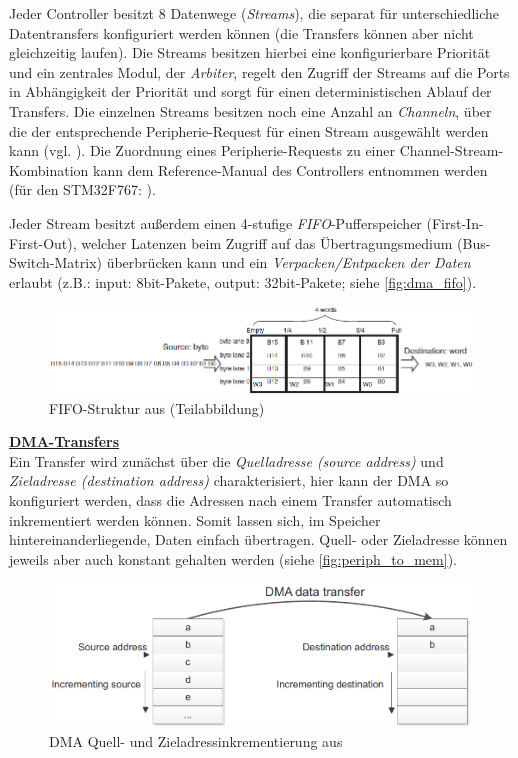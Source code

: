 \documentclass[a4paper, portrait, 12pt]{scrartcl} %
\begin{document}
Jeder Controller besitzt 8 Datenwege (\emph{Streams}), die separat für unterschiedliche Datentransfers konfiguriert werden können (die Transfers können aber nicht gleichzeitig laufen). Die Streams besitzen hierbei eine konfigurierbare Priorität und ein zentrales Modul, der \emph{Arbiter}, regelt den Zugriff der Streams auf die Ports in Abhängigkeit der Priorität und sorgt für einen deterministischen Ablauf der Transfers. Die einzelnen Streams besitzen noch eine Anzahl an \emph{Channeln}, über die der entsprechende Peripherie-Request für einen Stream ausgewählt werden kann (vgl. \cite[S. 7ff]{STmicroelectronics2016}). Die Zuordnung eines Peripherie-Requests zu einer Channel-Stream-Kombination kann dem Reference-Manual des Controllers entnommen werden (für den STM32F767: \cite[S. 252]{STmicroelectronics2024}).

\pagebreak

Jeder Stream besitzt außerdem einen 4-stufige \emph{FIFO}-Pufferspeicher (First-In-First-Out), welcher Latenzen beim Zugriff auf das Übertragungsmedium (Bus-Switch-Matrix) überbrücken kann und ein \emph{Verpacken/Entpacken der Daten} erlaubt (z.B.: input: 8bit-Pakete, output: 32bit-Pakete; siehe \autoref{fig:dma_fifo}).

\begin{figure}[H]
	\centering
    \includegraphics[scale=0.8]{STM32_DMA_FIFO.png} 
	\caption{FIFO-Struktur aus \cite[S. 11]{STmicroelectronics2016} (Teilabbildung)}
	\label{fig:dma_fifo}
\end{figure}

\textbf{\underline{DMA-Transfers}}\\
Ein Transfer wird zunächst über die \emph{Quelladresse (source address)} und \emph{Zieladresse (destination address)} charakterisiert, hier kann der DMA so konfiguriert werden, dass die Adressen nach einem Transfer automatisch inkrementiert werden können. Somit lassen sich, im Speicher hintereinanderliegende, Daten einfach übertragen. Quell- oder Zieladresse können jeweils aber auch konstant gehalten werden (siehe \autoref{fig:periph_to_mem}).

\begin{figure}[H]
	\centering
    \includegraphics[scale=0.6]{STM32_DMA_transfer_incrementing.png} 
	\caption{DMA Quell- und Zieladressinkrementierung aus \cite[S. 10]{STmicroelectronics2016}}
	\label{fig:dma_transfer_inc}
\end{figure}
\end{document}
